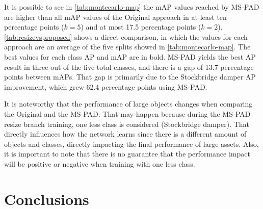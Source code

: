 \documentclass[10pt,conference]{IEEEtran}
\begin{document}
It is possible to see in \autoref{tab:montecarlo-map} the mAP values reached by MS-PAD are higher than all mAP values of the Original approach in at least ten percentage points ($k=5$) and at most 17.5 percentage points ($k=2$).\autoref{tab:resizevsproposed} shows a direct comparison, in which the values for each approach are an average of the five splits showed in \autoref{tab:montecarlo-map}. The best values for each class AP and mAP are in bold. MS-PAD yields the best AP result in three out of the five total classes, and there is a gap of 13.7 percentage points between mAPs. That gap is primarily due to the Stockbridge damper AP improvement, which grew 62.4 percentage points using MS-PAD. 

It is noteworthy that the performance of large objects changes when comparing the Original and the MS-PAD. That may happen because during the MS-PAD resize branch training, one less class is considered (Stockbridge damper). That directly influences how the network learns since there is a different amount of objects and classes, directly impacting the final performance of large assets. Also, it is important to note that there is no guarantee that the performance impact will be positive or negative when training with one less class.

































\section{Conclusions}
\label{sec:conclusion}
\end{document}
